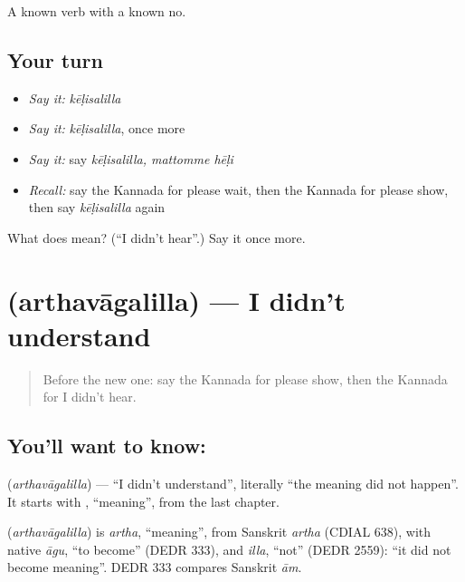 \begin{grammarlens}[title={What you've built}]
A known verb with a known no.
\end{grammarlens}

\subsection*{Your turn}
\begin{itemize}
\raggedright
  \item \emph{Say it:} \emph{kēḷisalilla}
  \item \emph{Say it:} \emph{kēḷisalilla}, once more
  \item \emph{Say it:} say \emph{kēḷisalilla, mattomme hēḷi}
  \item \emph{Recall:} say the Kannada for please wait, then the Kannada for please show, then say \emph{kēḷisalilla} again
\end{itemize}

\begin{tcolorbox}[breakable,colback=teal!4,colframe=teal!35!black,title={Before you move on}]
What does  mean? (\textquotedblleft{}I didn't hear\textquotedblright{}.) Say it once more.
\end{tcolorbox}
\section[\texorpdfstring{\kn{ಅರ್ಥವಾಗಲಿಲ್ಲ} (arthavāgalilla)}{ಅರ್ಥವಾಗಲಿಲ್ಲ (arthavāgalilla)}]{ (arthavāgalilla) — I didn't understand}

\label{lesson:KA-C86-didntunderstand}



\begin{quote}
Before the new one: say the Kannada for please show, then the Kannada for I didn't hear.
\end{quote}

\subsection*{You'll want to know: }
\textbf{} (\emph{arthavāgalilla}) — \textquotedblleft{}I didn't understand\textquotedblright{}, literally \textquotedblleft{}the meaning did not happen\textquotedblright{}. It starts with \textbf{}, \textquotedblleft{}meaning\textquotedblright{}, from the last chapter.

\begin{cousinweb}
\textbf{} (\emph{arthavāgalilla}) is \emph{artha}, \textquotedblleft{}meaning\textquotedblright{}, from Sanskrit \emph{artha} (CDIAL 638), with native \emph{āgu}, \textquotedblleft{}to become\textquotedblright{} (DEDR 333), and \emph{illa}, \textquotedblleft{}not\textquotedblright{} (DEDR 2559): \textquotedblleft{}it did not become meaning\textquotedblright{}. DEDR 333 compares Sanskrit \emph{ām}.
\end{cousinweb}

